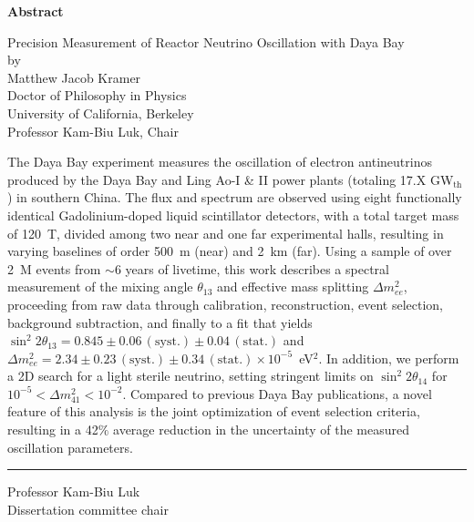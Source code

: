 \DoubleSpacing

\begin{center}
  \mylarge
  \textbf{Abstract}

  \vspace{1.5\baselineskip}
  Precision Measurement of Reactor Neutrino Oscillation with Daya Bay\\
  \vspace{\baselineskip} by\\
  \vspace{\baselineskip} Matthew Jacob Kramer\\
  Doctor of Philosophy in Physics\\
  University of California, Berkeley\\
  Professor Kam-Biu Luk, Chair
  \vspace{\baselineskip}
\end{center}

\normalsize
\MyDoubleSpacing
\noindent
%
The Daya Bay experiment measures the oscillation of electron antineutrinos produced by the Daya Bay and Ling Ao-I \& II power plants (totaling 17.X GW$_\mathrm{th}$) in southern China. The flux and spectrum are observed using eight functionally identical Gadolinium-doped liquid scintillator detectors, with a total target mass of 120~T, divided among two near and one far experimental halls, resulting in varying baselines of order 500~m (near) and 2~km (far). Using a sample of over 2~M events from $\sim$6 years of livetime, this work describes a spectral measurement of the mixing angle $\theta_{13}$ and effective mass splitting $\Delta m^2_{ee}$, proceeding from raw data through calibration, reconstruction, event selection, background subtraction, and finally to a fit that yields $\sin^2 2\theta_{13} = 0.845 \pm 0.06\,\mathrm{(syst.)} \pm 0.04\,\mathrm{(stat.)}$ and $\Delta m^2_{ee} = 2.34 \pm 0.23\,\mathrm{(syst.)} \pm 0.34\,\mathrm{(stat.)} \times 10^{-5}$~eV$^2$. In addition, we perform a 2D search for a light sterile neutrino, setting stringent limits on $\sin^2 2\theta_{14}$ for $10^{-5} < \Delta m^2_{41} < 10^{-2}$. Compared to previous Daya Bay publications, a novel feature of this analysis is the joint optimization of event selection criteria, resulting in a 42$\%$ average reduction in the uncertainty of the measured oscillation parameters.

\SingleSpacing
\vspace{2.5\baselineskip}
\hfill
\begin{minipage}{0.4\textwidth}
  \hrule\vspace{0.4\baselineskip}
  Professor Kam-Biu Luk\\
  Dissertation committee chair
\end{minipage}

\clearpage